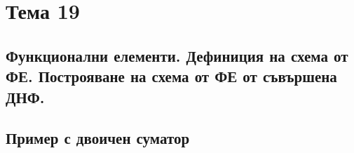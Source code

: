 \section{Тема 19}

\subsection{Функционални елементи. Дефиниция на схема от ФЕ. Построяване на схема от ФЕ от съвършена ДНФ.} 

\subsection{Пример с двоичен суматор}

